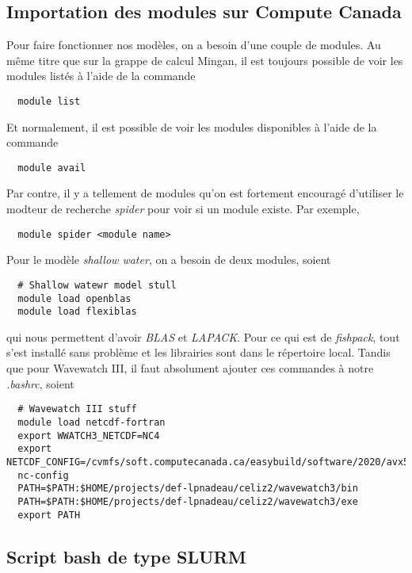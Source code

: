 \documentclass[10pt]{article}
\numberwithin{equation}{section}
\begin{document}
\subsection{Importation des modules sur Compute Canada}
\label{sec:org4e5b31d}
Pour faire fonctionner nos modèles, on a besoin d'une couple de modules.
Au même titre que sur la grappe de calcul Mingan, il est toujours possible de voir les modules listés à l'aide de la commande
\begin{verbatim}
  module list
\end{verbatim}
Et normalement, il est possible de voir les modules disponibles à l'aide de la commande
\begin{verbatim}
  module avail
\end{verbatim}
Par contre, il y a tellement de modules qu'on est fortement encouragé d'utiliser le modteur de recherche \emph{spider} pour voir si un module existe.
Par exemple,
\begin{verbatim}
  module spider <module name>
\end{verbatim}

Pour le modèle \emph{shallow water}, on a besoin de deux modules, soient
\begin{verbatim}
  # Shallow watewr model stull
  module load openblas
  module load flexiblas
\end{verbatim}
qui nous permettent d'avoir \emph{BLAS} et \emph{LAPACK}.
Pour ce qui est de \emph{fishpack}, tout s'est installé sans problème et les librairies sont dans le répertoire local.
Tandis que pour Wavewatch III, il faut absolument ajouter ces commandes à notre \emph{.bashrc}, soient 
\begin{verbatim}
  # Wavewatch III stuff                                                                       
  module load netcdf-fortran
  export WWATCH3_NETCDF=NC4
  export NETCDF_CONFIG=/cvmfs/soft.computecanada.ca/easybuild/software/2020/avx512/Compiler/intel2020/netcdf/4.9.0/bin/\
  nc-config
  PATH=$PATH:$HOME/projects/def-lpnadeau/celiz2/wavewatch3/bin
  PATH=$PATH:$HOME/projects/def-lpnadeau/celiz2/wavewatch3/exe
  export PATH
\end{verbatim}


\subsection{Script bash de type SLURM}
\label{sec:org6f67c0a}
\end{document}
